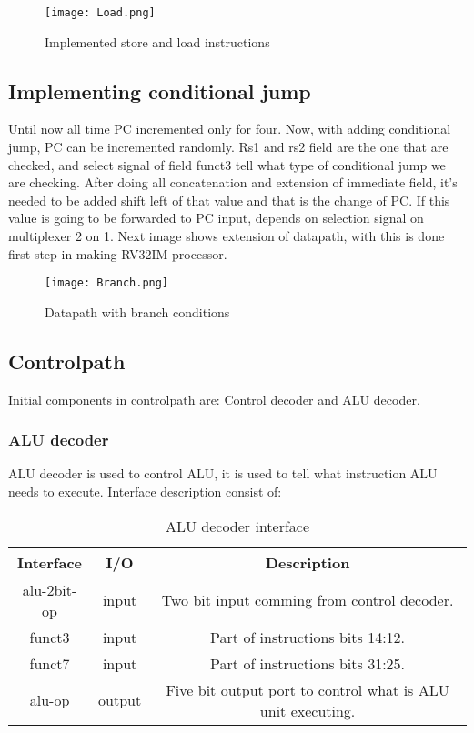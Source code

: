 \documentclass{scrreprt}
\begin{document}
\begin{figure}[htb!]
    \centering
    \texttt{[image: Load.png]}
    \caption{Implemented store and load instructions}
    \label{fig:Load&Store}
\end{figure}
\hfill \break
\hfill \break
\hfill \break
\hfill \break
\hfill \break
\hfill \break
\hfill \break
\hfill \break
\hfill \break
\hfill \break
{}
\subsection*{Implementing conditional jump}

Until now all time PC incremented only for four. Now, with adding conditional jump, PC can be incremented randomly. Rs1 and rs2 field are the one that are checked, and select signal of field funct3 tell what type of conditional jump we are checking. 
After doing all concatenation and extension of immediate field, it's needed to be added shift left of that value and that is the change of PC. If this value is going to be forwarded to PC input, depends on selection signal on multiplexer 2 on 1. 
Next image shows extension of datapath, with this is done first step in making RV32IM processor. 

\begin{figure}[htb!]
    \centering
    \texttt{[image: Branch.png]}
    \caption{Datapath with branch conditions}
    \label{fig:branch}
\end{figure}
\subsection*{Controlpath}
Initial components in controlpath are: Control decoder and ALU decoder. 
    \subsubsection*{ALU decoder}
        ALU decoder is used to control ALU, it is used to tell what instruction ALU needs to execute. Interface description consist of:
        \begin{table}[htb!]
        \centering
        \begin{tabular}{|c|c|c|} \hline 
             Interface & I/O & Description \\ \hline  
             alu-2bit-op & input & Two bit input comming from control decoder. \\ \hline  
             funct3 & input & Part of instructions bits 14:12.  \\ \hline
             funct7 & input & Part of instructions bits 31:25. \\ \hline
             alu-op & output & Five bit output port to control what is ALU unit executing.  \\ \hline
        \end{tabular}
        \caption{ALU decoder interface}
        \label{tab:ALUdecoder}
    \end{table}    
\end{document}
